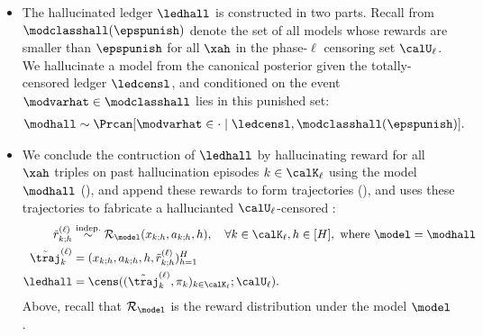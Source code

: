 \begin{itemize}
\item The hallucinated ledger $\ledhall$ is constructed in two parts. Recall from  $\modclasshall(\epspunish)$  denote the set of all models whose rewards are smaller than $\epspunish$ for all $\xah$ in the phase-$\ell$ censoring set $\calU_{\ell}$. We hallucinate a model from the canonical posterior given the totally-censored ledger $\ledcensl$, and conditioned on the event $\modvarhat \in \modclasshall$ lies in this punished set:
\begin{align}
\modhall \sim \Prcan[\modvarhat \in \cdot \mid \ledcensl , \modclasshall(\epspunish) ]. \label{eq:modhalll}
\end{align}
\item We conclude the contruction of $\ledhall$ by hallucinating reward for all $\xah$ triples on past  hallucination episodes $k \in \calK_{\ell}$ using the model $\modhall$ (), and append these rewards to form trajectories (), and uses these trajectories to fabricate a hallucianted $\calU_{\ell}$-censored :
\begin{align}
 \tilde{r}_{k;h}^{(\ell)} &\overset{\mathrm{indep.}}{\sim} \mathcal{R}_{\model}(x_{k;h},a_{k;h},h), \quad \forall k \in \calK_{\ell}, h \in {[H]}, \text{ where } \model = \modhall  \label{eq:hallucinate_rewards} \\
 \tilde{\traj}^{(\ell)}_{k} &= (x_{k;h},a_{k;h},h, \tilde{r}_{k;h}^{(\ell)})_{h=1}^H  \label{eq:hallucinate_trajectories} \\
\ledhall &= \cens((\tilde{\traj}^{(\ell)}_{k} , \pi_{k})_{k \in \calK_{\ell}};\calU_{\ell}). \label{eq:hallucinate_ledger}
\end{align}
Above, recall that $\mathcal{R}_{\model}$ is the reward distribution under the model $\model$.
\end{itemize}





